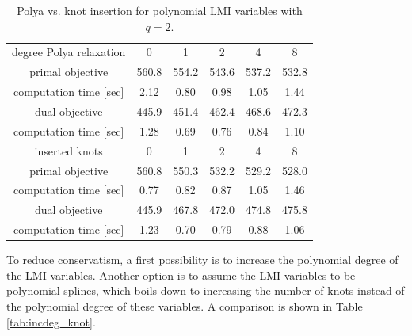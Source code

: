 \documentclass{article}
\begin{document}
\begin{table}
	\centering
	\caption{Polya vs. knot insertion for polynomial LMI variables with $q = 2$.} \vspace{0.2cm}
	\label{tab:polya_insknot}
	\begin{tabular}{cccccc}
		\toprule
	  degree Polya relaxation & 0     & 1     & 2     & 4     & 8     \\
	  primal objective        & 560.8 & 554.2 & 543.6 & 537.2 & 532.8 \\
	  computation time [sec]  & 2.12  & 0.80  & 0.98  & 1.05  & 1.44  \\
	  dual objective          & 445.9 & 451.4 & 462.4 & 468.6 & 472.3 \\
	  computation time [sec]  & 1.28  & 0.69  & 0.76  & 0.84  & 1.10  \\
	  \midrule
	  inserted knots          & 0     & 1     & 2     & 4     & 8     \\
	  primal objective        & 560.8 & 550.3 & 532.2 & 529.2 & 528.0 \\
	  computation time [sec]  & 0.77  & 0.82  & 0.87  & 1.05  & 1.46  \\
	  dual objective          & 445.9 & 467.8 & 472.0 & 474.8 & 475.8 \\
	  computation time [sec]  & 1.23  & 0.70  & 0.79  & 0.88  & 1.06  \\
		\bottomrule
	\end{tabular}
\end{table}

To reduce conservatism, a first possibility is to increase the polynomial degree of the LMI variables. Another option is to assume the LMI variables to be polynomial splines, which boils down to increasing the number of knots instead of the polynomial degree of these variables. A comparison is shown in Table \ref{tab:incdeg_knot}.
\end{document}
